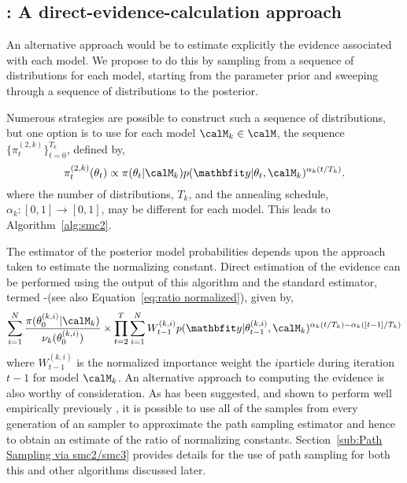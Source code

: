 \subsection[SMC2: A direct-evidence-calculation approach]
{\smc[2]: A direct-evidence-calculation approach}
\label{sub:smc2: A direct-evidence-calculation approach}

An alternative approach would be to estimate explicitly the evidence associated with each model. We propose to do this by sampling from a sequence of distributions for each model, starting from the parameter prior and sweeping through a sequence of distributions to the posterior.

Numerous strategies are possible to construct such a sequence of distributions, but one option is to use for each model $\calM_k\in\calM$, the sequence $\{\pi_t^{(2,k)}\}_{t=0}^{T_k}$, defined by,
\begin{equation}
  \pi_t^{(2,k)}(\theta_t) \propto
  \pi(\theta_t|\calM_k)p(\data|\theta_t,\calM_k)^{\alpha_k(t/T_k)}.
  \label{eq:geometry_2}
\end{equation}
where the number of distributions, $T_k$, and the annealing schedule, $\alpha_k:[0,1]\to[0,1]$, may be different for each model. This leads to Algorithm~\ref{alg:smc2}.



The estimator of the posterior model probabilities depends upon the approach taken to estimate the normalizing constant. Direct estimation of the evidence can be performed using the output of this \smc algorithm and the standard estimator, termed \smc[2]-\ds (see also Equation~\eqref{eq:ratio normalized}), given by,
\begin{equation}
  \sum_{i=1}^N \frac{\pi(\theta_0^{(k,i)}|\calM_k)}{\nu_k(\theta_0^{(k,i)})}
  \times \prod_{t=2}^T \sum_{i=1}^N W_{t-1}^{(k,i)}
  p(\data|\theta_{t-1}^{(k,i)},\calM_k)^{\alpha_k(t/T_k) - \alpha_k([t-1]/T_k)}
  \label{eq:smc2-ds}
\end{equation}
where $W_{t-1}^{(k,i)}$ is the normalized importance weight the $i$\xth particle during iteration $t-1$ for model $\calM_k$. An alternative approach to computing the evidence is also worthy of consideration. As has been suggested, and shown to perform well empirically previously \cite{Johansen:2006wm}, it is possible to use all of the samples from every generation of an \smc sampler to approximate the path sampling estimator and hence to obtain an estimate of the ratio of normalizing constants. Section~\ref{sub:Path Sampling via smc2/smc3} provides details for the use of path sampling for both this and other \smc algorithms discussed later.

